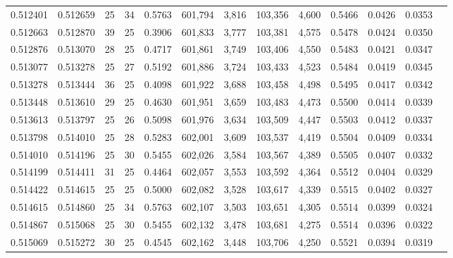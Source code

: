 \begin{tabular}{rrrrrrrrrrrrr}
0.512401 & 0.512659 &    25 &  34 &                                     0.5763 & 601,794 &   3,816 & 103,356 &   4,600 & 0.5466 & 0.0426 & 0.0353 \\
0.512663 & 0.512870 &    39 &  25 &                                     0.3906 & 601,833 &   3,777 & 103,381 &   4,575 & 0.5478 & 0.0424 & 0.0350 \\
0.512876 & 0.513070 &    28 &  25 &                                     0.4717 & 601,861 &   3,749 & 103,406 &   4,550 & 0.5483 & 0.0421 & 0.0347 \\
0.513077 & 0.513278 &    25 &  27 &                                     0.5192 & 601,886 &   3,724 & 103,433 &   4,523 & 0.5484 & 0.0419 & 0.0345 \\
0.513278 & 0.513444 &    36 &  25 &                                     0.4098 & 601,922 &   3,688 & 103,458 &   4,498 & 0.5495 & 0.0417 & 0.0342 \\
0.513448 & 0.513610 &    29 &  25 &                                     0.4630 & 601,951 &   3,659 & 103,483 &   4,473 & 0.5500 & 0.0414 & 0.0339 \\
0.513613 & 0.513797 &    25 &  26 &                                     0.5098 & 601,976 &   3,634 & 103,509 &   4,447 & 0.5503 & 0.0412 & 0.0337 \\
0.513798 & 0.514010 &    25 &  28 &                                     0.5283 & 602,001 &   3,609 & 103,537 &   4,419 & 0.5504 & 0.0409 & 0.0334 \\
0.514010 & 0.514196 &    25 &  30 &                                     0.5455 & 602,026 &   3,584 & 103,567 &   4,389 & 0.5505 & 0.0407 & 0.0332 \\
0.514199 & 0.514411 &    31 &  25 &                                     0.4464 & 602,057 &   3,553 & 103,592 &   4,364 & 0.5512 & 0.0404 & 0.0329 \\
0.514422 & 0.514615 &    25 &  25 &                                     0.5000 & 602,082 &   3,528 & 103,617 &   4,339 & 0.5515 & 0.0402 & 0.0327 \\
0.514615 & 0.514860 &    25 &  34 &                                     0.5763 & 602,107 &   3,503 & 103,651 &   4,305 & 0.5514 & 0.0399 & 0.0324 \\
0.514867 & 0.515068 &    25 &  30 &                                     0.5455 & 602,132 &   3,478 & 103,681 &   4,275 & 0.5514 & 0.0396 & 0.0322 \\
0.515069 & 0.515272 &    30 &  25 &                                     0.4545 & 602,162 &   3,448 & 103,706 &   4,250 & 0.5521 & 0.0394 & 0.0319 \\

\end{tabular}

